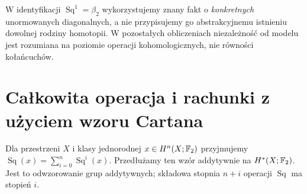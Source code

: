 \begin{uwaga}
W identyfikacji $\operatorname{Sq}^1=\beta_2$ wykorzystujemy
znany fakt o \emph{konkretnych} unormowanych diagonalnych, a nie
przypisujemy go abstrakcyjnemu istnieniu dowolnej rodziny homotopii.
W pozostałych obliczeniach niezależność od modelu jest rozumiana
na poziomie operacji kohomologicznych, nie równości kołańcuchów.
\end{uwaga}

\section{Całkowita operacja i rachunki z użyciem wzoru Cartana}
\begin{definicja}
Dla przestrzeni $X$ i klasy jednorodnej $x\in H^n(X;\mathbb{F}_2)$
przyjmujemy $\operatorname{Sq}(x)=\sum_{i=0}^n\operatorname{Sq}^i(x)$.
Przedłużamy ten wzór addytywnie na $H^*(X;\mathbb{F}_2)$.
Jest to odwzorowanie grup addytywnych; składowa stopnia $n+i$
operacji $\operatorname{Sq}$ ma stopień $i$.
\end{definicja}

